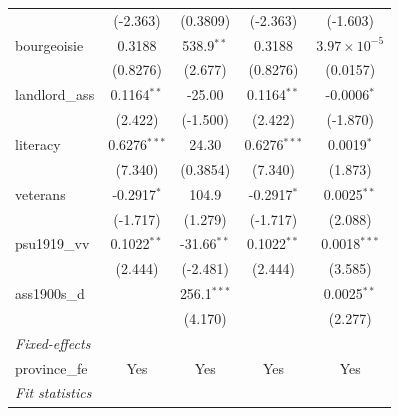 \begin{tabular}{lcccc}
                                    & (-2.363)                       & (0.3809)         & (-2.363)                       & (-1.603)\\   
   bourgeoisie                      & 0.3188                         & 538.9$^{**}$     & 0.3188                         & $3.97\times 10^{-5}$\\    
                                    & (0.8276)                       & (2.677)          & (0.8276)                       & (0.0157)\\   
   landlord\_ass                    & 0.1164$^{**}$                  & -25.00           & 0.1164$^{**}$                  & -0.0006$^{*}$\\   
                                    & (2.422)                        & (-1.500)         & (2.422)                        & (-1.870)\\   
   literacy                         & 0.6276$^{***}$                 & 24.30            & 0.6276$^{***}$                 & 0.0019$^{*}$\\   
                                    & (7.340)                        & (0.3854)         & (7.340)                        & (1.873)\\   
   veterans                         & -0.2917$^{*}$                  & 104.9            & -0.2917$^{*}$                  & 0.0025$^{**}$\\   
                                    & (-1.717)                       & (1.279)          & (-1.717)                       & (2.088)\\   
   psu1919\_vv                      & 0.1022$^{**}$                  & -31.66$^{**}$    & 0.1022$^{**}$                  & 0.0018$^{***}$\\   
                                    & (2.444)                        & (-2.481)         & (2.444)                        & (3.585)\\   
   ass1900s\_d                      &                                & 256.1$^{***}$    &                                & 0.0025$^{**}$\\   
                                    &                                & (4.170)          &                                & (2.277)\\   
   \midrule
   \emph{Fixed-effects}\\
   province\_fe                     & Yes                            & Yes              & Yes                            & Yes\\  
   \midrule
   \emph{Fit statistics}\\

\end{tabular}
